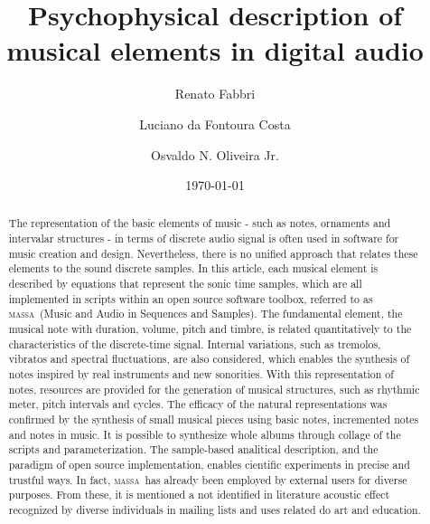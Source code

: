 \documentclass[
 aip,
 jmp,
 amsmath,amssymb,
 reprint,
]{revtex4-1}
\newcommand{\massa}{{\large \textsc{massa}}}
\begin{document}

\title{Psychophysical description of musical elements in digital audio}

\author{Renato Fabbri}

\author{Luciano da Fontoura Costa}

 \author{Osvaldo N. Oliveira Jr.}

\date{\today}
\begin{abstract}

    The representation of the basic elements of music - such as notes, ornaments and intervalar structures - in terms of discrete audio signal is often used in software for music creation and design. Nevertheless, there is no unified approach that relates these elements to the sound discrete samples. In this article, each musical element is described by equations that represent the sonic time samples, which are all implemented in scripts within an open source software toolbox, referred to as \massa\ (Music and Audio in Sequences and Samples). The fundamental element, the musical note with duration, volume, pitch and timbre, is related quantitatively to the characteristics of the discrete-time signal. Internal variations, such as tremolos, vibratos and spectral fluctuations, are also considered, which enables the synthesis of notes inspired by real instruments and new sonorities. With this representation of notes, resources are provided for the generation of musical structures, such as rhythmic meter, pitch intervals and cycles. The efficacy of the natural representations was confirmed by the synthesis of small musical pieces using basic notes, incremented notes and notes in music. It is possible to synthesize whole albums through collage of the scripts and parameterization. 
    The sample-based analitical description, and the paradigm of open source implementation, enables cientific experiments in precise and trustful ways. In fact, \massa\ has already been employed by external users for diverse purposes. From these, it is mentioned a not identified in literature acoustic effect recognized by diverse individuals in mailing lists and uses related do art and education.

\end{abstract}
\maketitle
\end{document}
